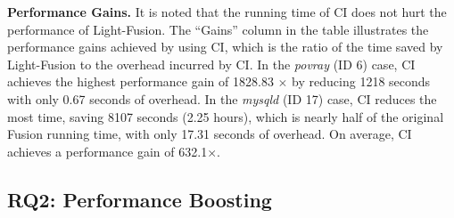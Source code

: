 \textbf{Performance Gains.}
It is noted that the running time of CI does not hurt the performance of Light-Fusion. 
The ``Gains'' column in the table illustrates the performance gains achieved by using CI, which is the ratio of the time saved by Light-Fusion to the overhead incurred by CI. 
In the \textit{povray} (ID 6) case, CI achieves the highest performance gain of 1828.83 $\times$ by reducing 1218 seconds with only 0.67 seconds of overhead.
In the \textit{mysqld} (ID 17) case, CI reduces the most time, saving 8107 seconds (2.25 hours), which is nearly half of the original Fusion running time, with only 17.31 seconds of overhead.
On average, CI achieves a performance gain of 632.1$\times$.




\subsection{RQ2: Performance Boosting}
\label{sec:rq2}






